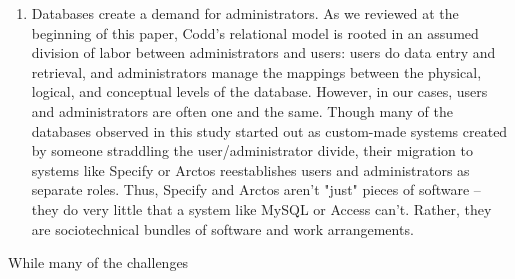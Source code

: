 \begin{enumerate}
\item Databases create a demand for administrators. As we reviewed at the beginning of this paper, Codd’s relational model is rooted in an assumed division of labor between administrators and users: users do data entry and retrieval, and administrators manage the mappings between the physical, logical, and conceptual levels of the database. However, in our cases, users and administrators are often one and the same. Though many of the databases observed in this study started out as custom-made systems created by someone straddling the user/administrator divide, their migration to systems like Specify or Arctos reestablishes users and administrators as separate roles. Thus, Specify and Arctos aren't "just" pieces of software -- they do very little that a system like MySQL or Access can't. Rather, they are sociotechnical bundles of software and work arrangements.
\end{enumerate}

While many of the challenges 



